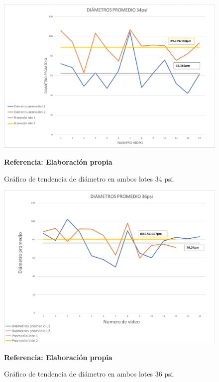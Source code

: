 \documentclass[12pt,twocolumn,a4paper]{article}
\begin{document}
\begin{figure}[h!]
	\centering
	\includegraphics[scale=0.6]{Diapro34.png}
	\caption{Gráfico de tendencia de diámetro en ambos lotes 34 psi.} \textbf{Referencia: Elaboración propia} 
	\label{diapro34}
\end{figure}

\begin{figure}[h!]
	\centering
	\includegraphics[scale=0.6]{Diapro36.png}
	\caption{Gráfico de tendencia de diámetro en ambos lotes 36 psi.} \textbf{Referencia: Elaboración propia} 
	\label{diapro36}
\end{figure}
\end{document}
